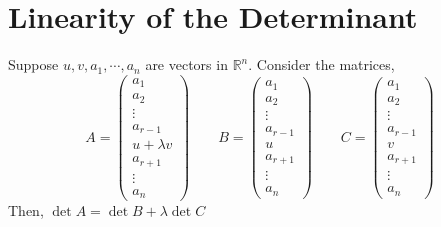 \documentclass[12pt]{article}
\begin{document}
\section{Linearity of the Determinant}
\begin{theo}{}
Suppose \(u, v, a_1, \cdots, a_n\) are vectors in \(\mathbb R^n\). Consider the matrices,
\[
A = \begin{pmatrix}
    a_1\\ a_2 \\ \vdots \\ a_{r-1} \\ u + \lambda v \\ a_{r+1} \\ \vdots \\ a_n
\end{pmatrix}  
\qquad
B = \begin{pmatrix}
    a_1\\ a_2 \\ \vdots \\ a_{r-1} \\ u \\ a_{r+1} \\ \vdots \\ a_n
\end{pmatrix} 
\qquad
C = \begin{pmatrix}
    a_1\\ a_2 \\ \vdots \\ a_{r-1} \\ v \\ a_{r+1} \\ \vdots \\ a_n
\end{pmatrix} 
\]
Then, \(\det A = \det B + \lambda \det C\)
\end{theo}
\end{document}
